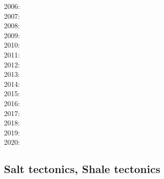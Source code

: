 {2006: \cite{tibs06}\cite{coma06}\cite{crwy06}\cite{peso06}\cite{lemm06}\cite{malm06}\\
2007: \cite{huha07}\cite{macl07}\cite{vabl07}\cite{dyrm07}\cite{hube07}\cite{buto07}\cite{socb07}
      \cite{werr07}\\
2008: \cite{cort08}\cite{gumb08}\cite{buhb08}\cite{hube08}\cite{peso08}\cite{rerw08}\cite{codh08}\\
2009: \cite{agcz09}\cite{kekj09}\cite{sihb09}\\
2010: \cite{aubh10}\cite{gery10}\cite{fosr10}\cite{gerya2010}\\
2011: \cite{alht11}\cite{ellw11}\cite{hube11}\\
2012: \cite{alht12}\cite{brps12}\cite{bein12}\\
2013: \cite{alhf13}\cite{brau13}\cite{chbe13}\cite{knak13}\cite{kern13}\cite{mipf13}\cite{wabd13}
      \cite{gery13}\cite{ligw13}\cite{gery13c}\cite{ebvk13}\\
2014: \cite{hebr14}\cite{lige14}\cite{brun14}\cite{kobf14}\cite{ebva14}\cite{puge14}\cite{lige14b}
      \cite{hube14}\cite{gogu14}\cite{ebva14}\cite{cosb14}\\
2015: \cite{nabu15}\cite{clbq15}\cite{huyb15}\cite{shmj15}\cite{svlh15}\cite{wulc15}\\
2016: \cite{olbm16}\cite{jekm16}\cite{zwsn16}\\
2017: \cite{lemh17}\cite{brcr17}\cite{bekb17}\cite{nabp17}\\
2018: \cite{chsm18}\cite{brwm18}\cite{brun18}\cite{tebu18}\cite{jebu18}\cite{sahf18}\cite{pesn18}
      \cite{mord18}\cite{webe18}\cite{webe18b}\cite{gebu18}\\
2019: \cite{lisp19}\cite{zwsb19}\cite{anpa19}\cite{dual19}\cite{mocb19}\cite{chmd19}\cite{thhu19}
      \cite{jala19}\cite{zwsr19}\\
2020: \cite{cump20}
}

\subsection{Salt tectonics, Shale tectonics}

